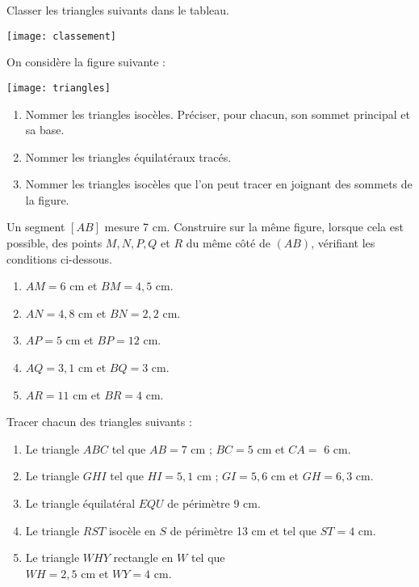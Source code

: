 \begin{colonne*exercice}


\begin{exercice}
   Classer les triangles suivants dans le tableau.
   \begin{center}
      \texttt{[image: classement]}
   \end{center}
\end{exercice}

\begin{exercice}
   On considère la figure suivante :
   \begin{center}
     \texttt{[image: triangles]}
   \end{center}
   \begin{enumerate}
      \item Nommer les triangles isocèles. Préciser, pour chacun, son sommet principal et sa base.
      \item Nommer les triangles équilatéraux tracés.
      \item Nommer les triangles isocèles que l'on peut tracer en joignant des sommets de la figure.
   \end{enumerate}
\end{exercice}


\begin{exercice}
   Un segment $[AB]$ mesure 7 cm. Construire sur la même figure, lorsque cela est possible, des points $M, N, P, Q$ et $R$ du même côté de $(AB)$, vérifiant les conditions ci-dessous.
   \begin{enumerate}
      \item $AM = 6$ cm et $BM = 4,5$ cm.
      \item $AN=4,8$ cm et $BN=2,2$ cm.
      \item $AP = 5$ cm et $BP = 12$ cm.
      \item $AQ=3,1$ cm et $BQ=3$ cm.
      \item $AR=11$ cm et $BR=4$ cm.
   \end{enumerate}
\end{exercice}

\begin{exercice}
   Tracer chacun des triangles suivants :
   \begin{enumerate}
      \item Le triangle $ABC$ tel que $AB =7$ cm ; $BC = 5$ cm et $CA =$ 6 cm.
      \item Le triangle $GHI$ tel que $HI = 5,1$ cm ; $GI = 5,6$ cm et $GH = 6,3$ cm.
      \item Le triangle équilatéral $EQU$ de périmètre 9 cm.
      \item Le triangle $RST$ isocèle en $S$ de périmètre 13 cm et tel que $ST=4$ cm.
      \item Le triangle $WHY$ rectangle en $W$ tel que \\ $WH =2,5$ cm et $WY =4$ cm.
   \end{enumerate}
\end{exercice}


\end{colonne*exercice}
